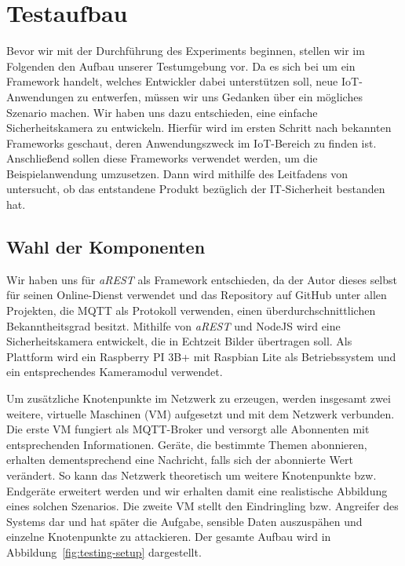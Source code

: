 \section{Testaufbau}
Bevor wir mit der Durchführung des Experiments beginnen, stellen wir im
Folgenden den Aufbau unserer Testumgebung vor. Da es sich bei \cite{paper} um
ein Framework handelt, welches Entwickler dabei unterstützen soll, neue
IoT-Anwendungen zu entwerfen, müssen wir uns Gedanken über ein mögliches
Szenario machen. Wir haben uns dazu entschieden, eine einfache Sicherheitskamera
zu entwickeln. Hierfür wird im ersten Schritt nach bekannten Frameworks
geschaut, deren Anwendungszweck im IoT-Bereich zu finden ist. Anschließend
sollen diese Frameworks verwendet werden, um die Beispielanwendung umzusetzen.
Dann wird mithilfe des Leitfadens von \cite{paper} untersucht, ob das
entstandene Produkt bezüglich der IT-Sicherheit bestanden hat.

\subsection{Wahl der Komponenten}

Wir haben uns für \textit{aREST} als Framework entschieden, da der Autor dieses
selbst für seinen Online-Dienst verwendet und das Repository auf GitHub unter
allen Projekten, die MQTT als Protokoll verwenden, einen über\-durch\-schnittlichen
Bekanntheitsgrad besitzt. Mithilfe von \textit{aREST} und NodeJS wird eine
Sicherheitskamera entwickelt, die in Echtzeit Bilder übertragen soll. Als
Plattform wird ein Raspberry PI 3B+ mit Raspbian Lite als Betriebssystem und ein
entsprechendes Kameramodul verwendet.

Um zusätzliche Knotenpunkte im Netzwerk zu erzeugen, werden insgesamt zwei
weitere, virtuelle Maschinen (VM) aufgesetzt und mit dem Netzwerk verbunden. Die
erste VM fungiert als MQTT-Broker und versorgt alle Abonnenten mit entsprechenden
Informationen. Geräte, die bestimmte Themen abonnieren, erhalten dementsprechend
eine Nachricht, falls sich der abonnierte Wert verändert. So kann das Netzwerk
theoretisch um weitere Knotenpunkte bzw. Endgeräte erweitert werden und wir
erhalten damit eine realistische Abbildung eines solchen Szenarios. Die zweite
VM stellt den Eindringling bzw. Angreifer des Systems dar und hat später die
Aufgabe, sensible Daten auszuspähen und einzelne Knotenpunkte zu attackieren.
Der gesamte Aufbau wird in Abbildung~\ref{fig:testing-setup} dargestellt.

